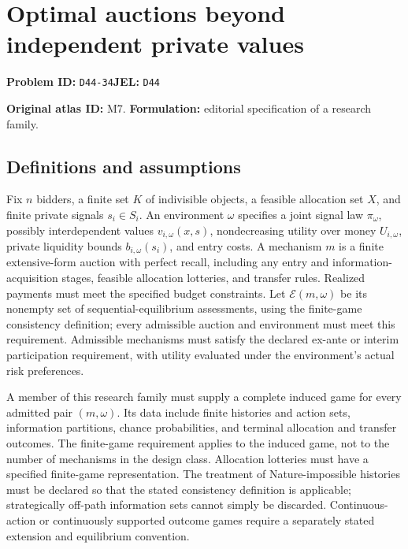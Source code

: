 \documentclass[11pt,a4paper]{article}
\begin{document}
\section*{Optimal auctions beyond independent private values}
\textbf{Problem ID:} \texttt{D44-34}\quad \textbf{JEL:} \texttt{D44}\par
\label{problem:OP-0007}
\label{atlas:prob:M7}

\noindent\textbf{Original atlas ID:} M7. \textbf{Formulation:} editorial specification of a research family.

\subsection*{Definitions and assumptions}

Fix $n$ bidders, a finite set $K$ of indivisible objects, a feasible allocation set $X$, and finite private signals $s_i\in S_i$. An environment $\omega$ specifies a joint signal law $\pi_\omega$, possibly interdependent values $v_{i,\omega}(x,s)$, nondecreasing utility over money $U_{i,\omega}$, private liquidity bounds $b_{i,\omega}(s_i)$, and entry costs. A mechanism $m$ is a finite extensive-form auction with perfect recall, including any entry and information-acquisition stages, feasible allocation lotteries, and transfer rules. Realized payments must meet the specified budget constraints. Let $\mathcal E(m,\omega)$ be its nonempty set of sequential-equilibrium assessments, using the finite-game consistency definition; every admissible auction and environment must meet this requirement. Admissible mechanisms must satisfy the declared ex-ante or interim participation requirement, with utility evaluated under the environment's actual risk preferences.

A member of this research family must supply a complete induced game for every admitted pair $(m,\omega)$. Its data include finite histories and action sets, information partitions, chance probabilities, and terminal allocation and transfer outcomes. The finite-game requirement applies to the induced game, not to the number of mechanisms in the design class. Allocation lotteries must have a specified finite-game representation. The treatment of Nature-impossible histories must be declared so that the stated consistency definition is applicable; strategically off-path information sets cannot simply be discarded. Continuous-action or continuously supported outcome games require a separately stated extension and equilibrium convention.
\end{document}
